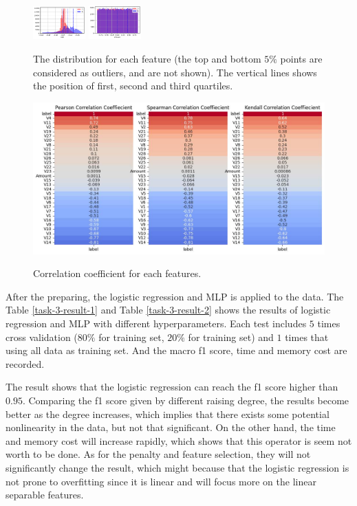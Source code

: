 \documentclass[11pt]{article}
\begin{document}
\begin{figure}[H]
  \includegraphics[width=0.18\textwidth]{../code/Task3/Analysis/Hist-V28.jpg}
  \includegraphics[width=0.18\textwidth]{../code/Task3/Analysis/Hist-Amount.jpg}
  \caption{The distribution for each feature (the top and bottom $5\%$ points are considered as outliers, and are not shown). The vertical lines shows the position of first, second and third quartiles.}
  \label{task-3-data-distribution-feature}
\end{figure}

\begin{figure}[H]
  \centering
  \includegraphics[width=\textwidth]{../code/Task3/Analysis/corrcoef.jpg} \\
  \caption{Correlation coefficient for each features.}
  \label{task-3-correlation-coefficient}
\end{figure}

After the preparing, the logistic regression and MLP is applied to the data. The Table \ref{task-3-result-1} and Table \ref{task-3-result-2} shows the results of logistic regression and MLP with different hyperparameters. Each test includes $5$ times cross validation ($80\%$ for training set, $20\%$ for training set) and $1$ times that using all data as training set. And the macro f1 score, time and memory cost are recorded.

The result shows that the logistic regression can reach the f1 score higher than $0.95$. Comparing the f1 score given by different raising degree, the results become better as the degree increases, which implies that there exists some potential nonlinearity in the data, but not that significant. On the other hand, the time and memory cost will increase rapidly, which shows that this operator is seem not worth to be done. As for the penalty and feature selection, they will not significantly change the result, which might because that the logistic regression is not prone to overfitting since it is linear and will focus more on the linear separable features.
\end{document}
